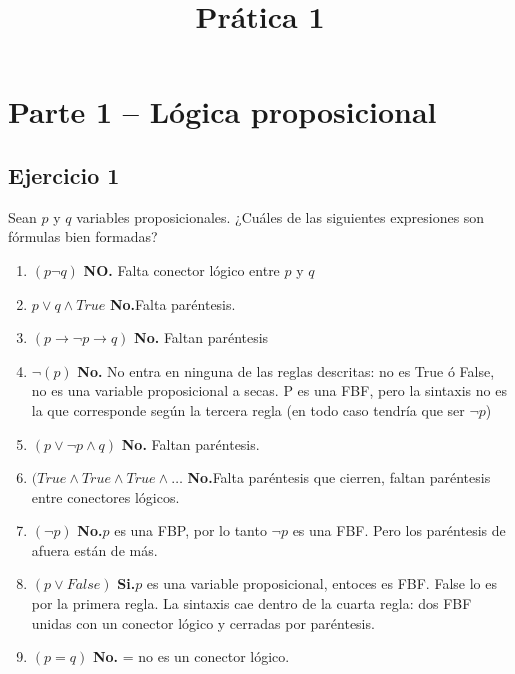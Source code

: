 \documentclass[10pt,a4paper]{article}
\title{Prática 1}
\date{}
\begin{document}
\maketitle

\section*{Parte 1 – Lógica proposicional}
\subsection*{Ejercicio 1}
Sean $p$ y $q$ variables proposicionales. ¿Cuáles de las siguientes expresiones son fórmulas bien formadas?
\begin{enumerate}

\item $(p\neg q)$ \textbf{NO.} Falta conector lógico entre $p$ y $q$
\item $p \vee q \wedge True$ \textbf{No.}Falta paréntesis.
\item $(p\rightarrow \neg p \rightarrow q)$  \textbf{No.} Faltan paréntesis
\item $\neg(p)$ \textbf{No.} No entra en ninguna de las reglas descritas: no es True ó False, no es una variable proposicional a secas. P es una FBF, pero la sintaxis no es la que corresponde según la tercera regla (en todo caso tendría que ser $\neg p$)
\item $(p \vee \neg p \wedge q)$ \textbf{No.} Faltan paréntesis.
\item $(True \wedge True \wedge True \wedge \ldots $ \textbf{No.}Falta paréntesis que cierren, faltan paréntesis entre conectores lógicos.
\item $(\neg p)$ \textbf{No.}$p$ es una FBP, por lo tanto $\neg p$ es una FBF. Pero los paréntesis de afuera están de más.
\item $(p \vee False)$ \textbf{Si.}$p$ es una variable proposicional, entoces es FBF. False lo es por la primera regla. La sintaxis cae dentro de la cuarta regla: dos FBF unidas con un conector lógico y cerradas por paréntesis.
\item $(p=q)$ \textbf{No.} = no es un conector lógico.

\end{enumerate}
\end{document}
